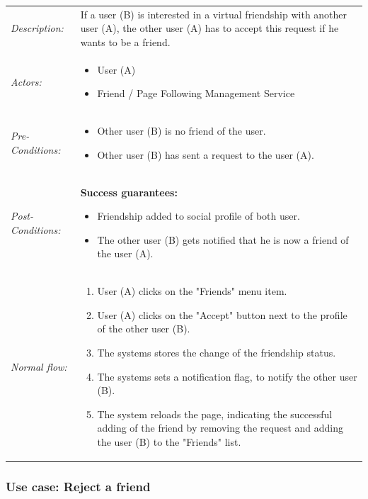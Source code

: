 \documentclass[11pt,a4paper]{report}
\begin{document}
\begin{longtable}{p{} | p{}}
        \hline
        \emph{Description:} & If a user (B) is interested in a virtual friendship with another user (A), the  other user (A) has to accept this request if he wants to be a friend.\\
        \emph{Actors:} & 
            \begin{itemize} 
                \item User (A)
                \item Friend / Page Following Management Service
             \end{itemize} \\
        \emph{Pre-Conditions:} & 
            \begin{itemize} 
                \item Other user (B) is no friend of the user.
                \item Other user (B) has sent a request to the user (A).
             \end{itemize} \\
        \emph{Post-Conditions:} & \textbf{Success guarantees:} 
            \begin{itemize} 
                \item Friendship added to social profile of both user.
                \item The other user (B) gets notified that he is now a friend of the user (A).
             \end{itemize} \\
        \emph{Normal flow:} & 
            \begin{enumerate} 
                \item User (A) clicks on the "Friends" menu item.
                \item User (A) clicks on the "Accept" button next to the profile of the other user (B).
                \item The systems stores the change of the friendship status.
                \item The systems sets a notification flag, to notify the other user (B).
                \item The system reloads the page, indicating the successful adding of the friend by removing the request and adding the user (B) to the "Friends" list.
             \end{enumerate} \\
             \hline
\end{longtable}
\pagebreak
\subsubsection{Use case: Reject a friend}
\end{document}
